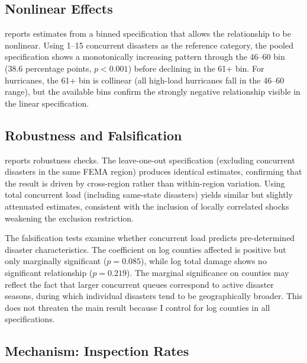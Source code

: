\documentclass[12pt]{article}
\begin{document}


\subsection{Nonlinear Effects}

 reports estimates from a binned specification that allows the relationship to be nonlinear. Using 1--15 concurrent disasters as the reference category, the pooled specification shows a monotonically increasing pattern through the 46--60 bin (38.6 percentage points, $p < 0.001$) before declining in the 61+ bin. For hurricanes, the 61+ bin is collinear (all high-load hurricanes fall in the 46--60 range), but the available bins confirm the strongly negative relationship visible in the linear specification.



\subsection{Robustness and Falsification}

 reports robustness checks. The leave-one-out specification (excluding concurrent disasters in the same FEMA region) produces identical estimates, confirming that the result is driven by cross-region rather than within-region variation. Using total concurrent load (including same-state disasters) yields similar but slightly attenuated estimates, consistent with the inclusion of locally correlated shocks weakening the exclusion restriction.

The falsification tests examine whether concurrent load predicts pre-determined disaster characteristics. The coefficient on log counties affected is positive but only marginally significant ($p = 0.085$), while log total damage shows no significant relationship ($p = 0.219$). The marginal significance on counties may reflect the fact that larger concurrent queues correspond to active disaster seasons, during which individual disasters tend to be geographically broader. This does not threaten the main result because I control for log counties in all specifications.



\subsection{Mechanism: Inspection Rates}
\end{document}

